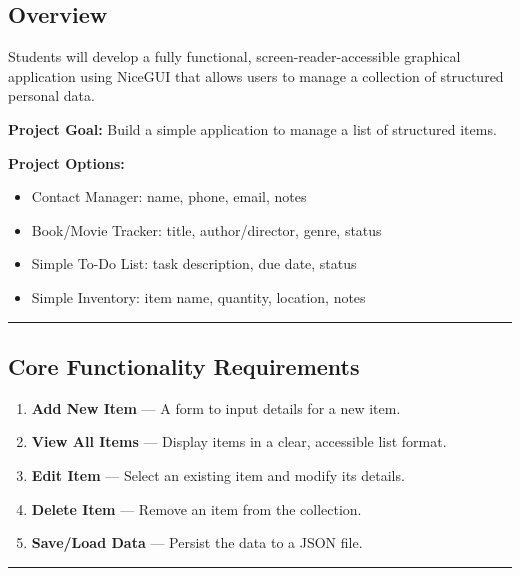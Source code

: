 \documentclass[
  justified,
  openright,
]{tufte-book}
\providecommand{\tightlist}{%
  \setlength{\itemsep}{0pt}\setlength{\parskip}{0pt}}
\begin{document}
\subsection{Overview}\label{overview-11}

Students will develop a fully functional, screen-reader-accessible
graphical application using NiceGUI that allows users to manage a
collection of structured personal data.

\textbf{Project Goal:} Build a simple application to manage a list of
structured items.

\textbf{Project Options:}

\begin{itemize}
\tightlist
\item
  Contact Manager: name, phone, email, notes
\item
  Book/Movie Tracker: title, author/director, genre, status
\item
  Simple To-Do List: task description, due date, status
\item
  Simple Inventory: item name, quantity, location, notes
\end{itemize}

\begin{center}\rule{0.5\linewidth}{0.5pt}\end{center}

\subsection{Core Functionality
Requirements}\label{core-functionality-requirements}

\begin{enumerate}
\def\labelenumi{\arabic{enumi}.}
\tightlist
\item
  \textbf{Add New Item} --- A form to input details for a new item.
\item
  \textbf{View All Items} --- Display items in a clear, accessible list
  format.
\item
  \textbf{Edit Item} --- Select an existing item and modify its details.
\item
  \textbf{Delete Item} --- Remove an item from the collection.
\item
  \textbf{Save/Load Data} --- Persist the data to a JSON file.
\end{enumerate}

\begin{center}\rule{0.5\linewidth}{0.5pt}\end{center}
\end{document}
